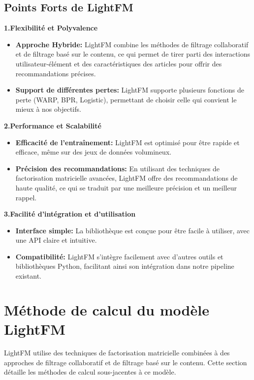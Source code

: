 \documentclass[edit,12pt,a4paper,ChapStyle,oneside,doubleinterligne]{report}
\begin{document}
\subsection*{Points Forts de LightFM}
\textbf{1.Flexibilité et Polyvalence}
\begin{itemize}
    \item \textbf{Approche Hybride: }LightFM combine les méthodes de filtrage collaboratif et de filtrage basé sur le contenu, ce qui permet de tirer parti des interactions utilisateur-élément et des caractéristiques des articles pour offrir des recommandations précises.
    \item \textbf{Support de différentes pertes: }LightFM supporte plusieurs fonctions de perte (WARP, BPR, Logistic), permettant de choisir celle qui convient le mieux à nos objectifs.
\end{itemize}
\phantom{2.2}\textbf{2.Performance et Scalabilité}
\begin{itemize}
    \item \textbf{Efficacité de l'entraînement: }LightFM est optimisé pour être rapide et efficace, même sur des jeux de données volumineux.
    \item \textbf{Précision des recommandations: }En utilisant des techniques de factorisation matricielle avancées, LightFM offre des recommandations de haute qualité, ce qui se traduit par une meilleure précision et un meilleur rappel.
\end{itemize}
\phantom{2.2}\textbf{3.Facilité d'intégration et d'utilisation}
\begin{itemize}
    \item \textbf{Interface simple: }La bibliothèque est conçue pour être facile à utiliser, avec une API claire et intuitive.
    \item \textbf{Compatibilité: }LightFM s'intègre facilement avec d'autres outils et bibliothèques Python, facilitant ainsi son intégration dans notre pipeline existant.
\end{itemize}

\section{Méthode de calcul du modèle LightFM}
LightFM utilise des techniques de factorisation matricielle combinées à des approches de filtrage collaboratif et de filtrage basé sur le contenu. Cette section détaille les méthodes de calcul sous-jacentes à ce modèle.
\end{document}
